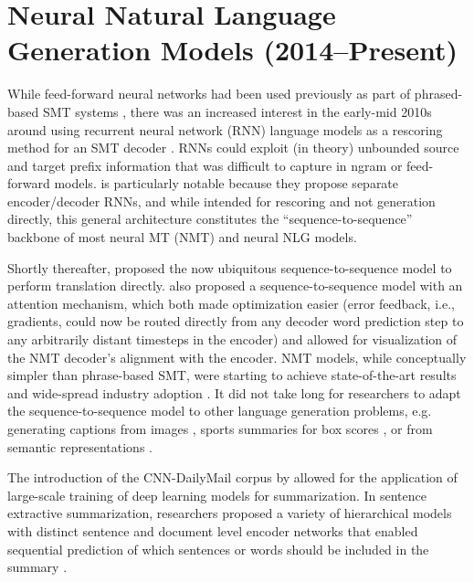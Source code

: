 \section{Neural Natural Language Generation Models (2014--Present)}
  
While feed-forward neural networks had been used previously as part of
phrased-based SMT systems \citep{schwenk2006}, there was an increased interest
in the early-mid 2010s around using recurrent neural network (RNN) language
models \citep{mikolov2010} as a rescoring method for an SMT decoder
\citep{auli2013,cho2014learning}.  RNNs could exploit (in theory) unbounded
source and target prefix information that was difficult to capture in ngram or
feed-forward models. \citet{cho2014learning} is particularly notable because
they propose separate encoder/decoder RNNs, and while intended for rescoring
and not generation directly, this general architecture constitutes the
``sequence-to-sequence'' backbone of most neural MT (NMT) and neural NLG
models.
  
Shortly thereafter, \citet{sutskever2014} proposed the now ubiquitous
sequence-to-sequence model to perform translation directly.
\citet{bahdanau2015}  also proposed a sequence-to-sequence model with an
attention mechanism, which both made optimization easier (error feedback, i.e.,
gradients, could now be routed directly from any decoder word prediction step
to any arbitrarily  distant timesteps in the encoder) and allowed for
visualization of the NMT decoder's alignment with the encoder.  NMT models,
while conceptually simpler than phrase-based SMT, were starting to achieve
state-of-the-art results \citep{bojar2016} and wide-spread industry adoption
\citep{wu2016google,gehring2017}.  It did not take long for researchers to
adapt the sequence-to-sequence model to other language generation problems,
e.g. generating captions from images \citep{vinyals2015a}, sports summaries for
box scores \cite{lebret2016,wiseman2017}, or from semantic representations
\citep{wen2015,dusek2016}. 
  
The introduction of the CNN-DailyMail corpus by \cite{hermann2015} allowed for
the application of large-scale training of deep learning models for
summarization. In sentence extractive summarization, researchers proposed a
variety of hierarchical models with distinct sentence and document level
encoder networks that enabled sequential prediction of which sentences or words
should be included in the summary
\citep{cheng2016neural,nallapati2017summarunner}.

